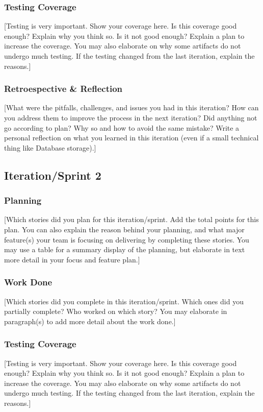 \documentclass{article}
\begin{document}
\subsubsection{Testing Coverage}
[Testing is very important. Show your coverage here. Is this coverage good enough? Explain why you think so. Is it not good enough? Explain a plan to increase the coverage. You may also elaborate on why some artifacts do not undergo much testing. If the testing changed from the last iteration, explain the reasons.]

\subsubsection{Retroespective \& Reflection}
[What were the pitfalls, challenges, and issues you had in this iteration? How can you address them to improve the process in the next iteration? Did anything not go according to plan? Why so and how to avoid the same mistake? Write a personal reflection on what you learned in this iteration (even if a small technical thing like Database storage).]


\subsection{Iteration/Sprint 2}
\subsubsection{Planning}
[Which stories did you plan for this iteration/sprint. Add the total points for this plan. You can also explain the reason behind your planning, and what major feature(s) your team is focusing on delivering by completing these stories. You may use a table for a summary display of the planning, but elaborate in text more detail in your focus and feature plan.]

\subsubsection{Work Done}
[Which stories did you complete in this iteration/sprint. Which ones did you partially complete? Who worked on which story? You may elaborate in paragraph(s) to add more detail about the work done.]

\subsubsection{Testing Coverage}
[Testing is very important. Show your coverage here. Is this coverage good enough? Explain why you think so. Is it not good enough? Explain a plan to increase the coverage. You may also elaborate on why some artifacts do not undergo much testing. If the testing changed from the last iteration, explain the reasons.]
\end{document}
